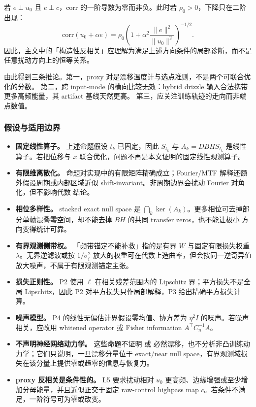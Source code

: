若 \(e\perp u_0\) 且 \(e\perp c\)，corr 的一阶导数为零而非负。此时若 \(\rho_0>0\)，下降只在二阶出现：
\[
  \mathrm{corr}(u_0+\alpha e)
  =\rho_0\left(1+\alpha^2\frac{\|e\|^2}{\|u_0\|^2}\right)^{-1/2}.
\]
因此，主文中的「构造性反相关」应理解为满足上述方向条件的局部诊断，而不是任意扰动方向上的恒等关系。

由此得到三条推论。第一，proxy 对是漂移温度计与选点准则，不是两个可联合优化的分数。
第二，跨 input-mode 的横向比较无效：hybrid drizzle 输入合法携带更多高频能量，其 artifact 基线天然更高。
第三，应关注训练轨迹的走向而非端点数值。

\subsubsection{假设与适用边界}

\begin{itemize}
  \item \textbf{固定线性算子。} 上述命题假设 \(t_k\) 已固定，因此 \(S_{t_k}\) 与 \(A_k=D B H S_{t_k}\) 是线性算子。若把位移与 \(x\) 联合优化，问题不再是本文证明的固定线性观测算子。
  \item \textbf{有限维离散化。}  命题对实现中的有限矩阵精确成立；Fourier/MTF 解释还额外假设周期或内部区域近似 shift-invariant。非周期边界会扰动 Fourier 对角化，但不影响代数  结论。
  \item \textbf{相位多样性。} stacked exact null space 是 \(\bigcap_k\ker(A_k)\)。更多相位可去掉部分单帧混叠零空间，却不能去掉 \(B H\) 的共同 transfer zeros，也不能让极小  方向变得统计可靠。
  \item \textbf{有界观测侧带权。} 「频带锚定不能补救」指的是有界 \(W\) 与固定有限损失权重 \(\lambda\)。无界逆滤波或按 \(1/\sigma_i^2\) 放大的权重可在代数上造曲率，但会按同一逆奇异值放大噪声，不属于有限观测锚定主张。
  \item \textbf{损失正则性。} P2 使用 \(\ell\) 在相关残差范围内的 Lipschitz 界；平方损失不是全局 Lipschitz，因此 P2 对平方损失只作局部解释，P3 给出精确平方损失计算。
  \item \textbf{噪声模型。} P4 的线性无偏估计界假设零均值、协方差为 \(\eta^2 I\) 的噪声。若噪声相关，应改用 whitened operator 或 Fisher information \(A^\top C_n^{-1}A\)。
  \item \textbf{不声明神经网络动力学。} 这些命题不证明  或  必然漂移，也不分析非凸训练动力学；它们只说明，一旦漂移分量位于 exact/near null space，有界观测域损失在该分量上提供零或趋零的信息与恢复力。
  \item \textbf{proxy 反相关是条件性的。} L5 要求扰动相对 \(u_0\) 更高频、边缘增强或至少增加分母能量，并且近似正交于固定 raw-control highpass map \(c\)。若条件不满足，一阶符号可为零或改变。
\end{itemize}

